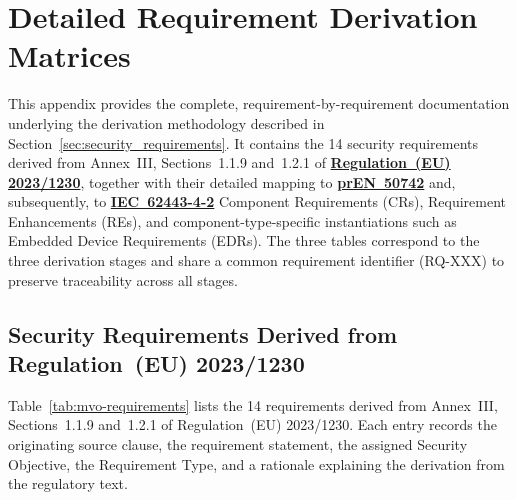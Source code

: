 \chapter{Detailed Requirement Derivation Matrices}
\label{app:requirement_derivation}

This appendix provides the complete, requirement-by-requirement documentation underlying the derivation methodology described in Section~\ref{sec:security_requirements}. It contains the 14 security requirements derived from Annex~III, Sections~1.1.9 and~1.2.1 of \hyperref[subsec:eu_machinery_regulation]{\textbf{Regulation~(EU) 2023/1230}}, together with their detailed mapping to \hyperref[subsec:pren_50742]{\textbf{prEN~50742}} and, subsequently, to \hyperref[subsec:iec_62443]{\textbf{IEC~62443-4-2}} Component Requirements (CRs), Requirement Enhancements (REs), and component-type-specific instantiations such as Embedded Device Requirements (EDRs). The three tables correspond to the three derivation stages and share a common requirement identifier (RQ-XXX) to preserve traceability across all stages.

\section{Security Requirements Derived from Regulation~(EU) 2023/1230}
\label{app:sec:mvo_requirements}

Table~\ref{tab:mvo-requirements} lists the 14 requirements derived from Annex~III, Sections~1.1.9 and~1.2.1 of Regulation~(EU) 2023/1230. Each entry records the originating source clause, the requirement statement, the assigned Security Objective, the Requirement Type, and a rationale explaining the derivation from the regulatory text.

